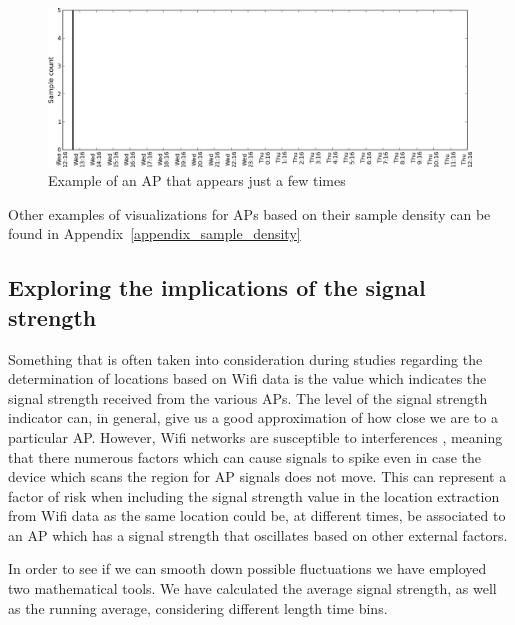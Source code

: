 \begin{figure}[h]
\centering
\includegraphics[width
=\textwidth, height =
0.4\textwidth]{figures/combinations/1553_modif.png}
\caption{Example of an AP that appears just a few times}
\label{few_samples_6_2nd_day}
\end{figure}

Other examples of visualizations for APs based on their sample density can be
found in Appendix~\ref{appendix_sample_density}%

\subsection{Exploring the implications of the signal strength}
Something that is often taken into consideration during studies regarding the
determination of locations based on Wifi data is the value which indicates
the signal strength received from the various APs. The level of the signal
strength indicator can, in general, give us a good approximation of how close we
are to a particular AP. However, Wifi networks are susceptible to interferences
\cite{MahantiCWA10}, meaning that there numerous factors which can cause signals
to spike even in case the device which scans the region for AP signals does not
move. This can represent a factor of risk when including the signal strength
value in the location extraction from Wifi data as the same location could be,
at different times, be associated to an AP which has a signal strength that
oscillates based on other external factors.

In order to see if we can smooth down possible fluctuations we have employed two
mathematical tools. We have calculated the average signal strength, as well as
the running average, considering different length time bins.

